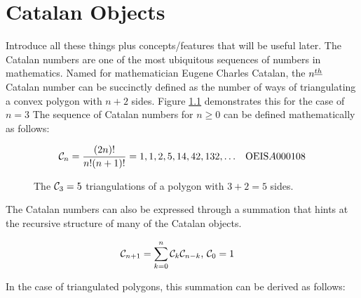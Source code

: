\chapter{Catalan Objects}
Introduce all these things plus concepts/features that will be useful later.
The Catalan numbers are one of the most ubiquitous sequences of numbers in mathematics.  
Named for mathematician Eugene Charles Catalan, the $n^{\underline{th}}$ Catalan number can be succinctly defined as the number of ways of triangulating a convex polygon with $n+2$ sides.  Figure \ref{fig:pentagontriangulations} demonstrates this for the case of $n=3$ The sequence of Catalan numbers for $n \ge 0$ can be defined mathematically as follows:

\begin{align}
    \mathcal{C}_n &= \frac{(2n)!}{n!(n+1)!} =1, 1, 2, 5, 14, 42, 132, \ldots & \text{OEIS} A000108
\end{align}

\begin{figure}
\begin{center}
\end{center}
    \caption{The $\mathcal{C}_3=5$ triangulations of a polygon with $3+2=5$ sides.}
\label{fig:pentagontriangulations}
\end{figure}
The Catalan numbers can also be expressed through a summation that hints at the recursive structure of many of the Catalan objects.  

\begin{align}
    \mathcal{C}_{n+1} &= \sum_{k=0}^{n}{\mathcal{C}_{k}\mathcal{C}_{n-k}} \textrm{,   }  \mathcal{C}_0=1
\end{align} 

In the case of triangulated polygons, this summation can be derived as follows:

